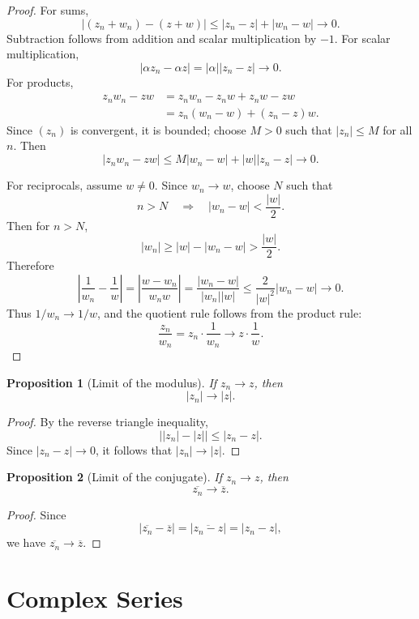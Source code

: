 \documentclass[11pt]{article}
\newtheorem{proposition}{Proposition}[section]
\newcommand{\abs}[1]{\left|#1\right|}
\newcommand{\conj}[1]{\overline{#1}}
\begin{document}
\begin{proof}
For sums,
\[
  \abs{(z_{n}+w_{n})-(z+w)}
  \le \abs{z_{n}-z}+\abs{w_{n}-w}\to0.
\]
Subtraction follows from addition and scalar multiplication by $-1$.
For scalar multiplication,
\[
  \abs{\alpha z_{n}-\alpha z}
  =\abs{\alpha}\abs{z_{n}-z}\to0.
\]
For products,
\[
\begin{aligned}
  z_{n}w_{n}-zw
    &=z_{n}w_{n}-z_{n}w+z_{n}w-zw \\
    &=z_{n}(w_{n}-w)+(z_{n}-z)w.
\end{aligned}
\]
Since $(z_{n})$ is convergent, it is bounded; choose $M>0$ such that $\abs{z_{n}}\le M$ for all $n$.
Then
\[
  \abs{z_{n}w_{n}-zw}
  \le M\abs{w_{n}-w}+\abs{w}\abs{z_{n}-z}\to0.
\]

For reciprocals, assume $w\ne0$.
Since $w_{n}\to w$, choose $N$ such that
\[
  n>N\quad\Longrightarrow\quad \abs{w_{n}-w}<\frac{\abs{w}}{2}.
\]
Then for $n>N$,
\[
  \abs{w_{n}}\ge \abs{w}-\abs{w_{n}-w}>\frac{\abs{w}}{2}.
\]
Therefore
\[
  \abs{\frac{1}{w_{n}}-\frac{1}{w}}
  =\abs{\frac{w-w_{n}}{w_{n}w}}
  =\frac{\abs{w_{n}-w}}{\abs{w_{n}}\abs{w}}
  \le \frac{2}{\abs{w}^{2}}\abs{w_{n}-w}\to0.
\]
Thus $1/w_{n}\to1/w$, and the quotient rule follows from the product rule:
\[
  \frac{z_{n}}{w_{n}}=z_{n}\cdot\frac{1}{w_{n}}\to z\cdot\frac{1}{w}.
\]
\end{proof}

\begin{proposition}[Limit of the modulus]
If $z_{n}\to z$, then
\[
  \abs{z_{n}}\to \abs{z}.
\]
\end{proposition}

\begin{proof}
By the reverse triangle inequality,
\[
  \bigl|\abs{z_{n}}-\abs{z}\bigr|\le \abs{z_{n}-z}.
\]
Since $\abs{z_{n}-z}\to0$, it follows that $\abs{z_{n}}\to\abs{z}$.
\end{proof}

\begin{proposition}[Limit of the conjugate]
If $z_{n}\to z$, then
\[
  \conj{z_{n}}\to \conj{z}.
\]
\end{proposition}

\begin{proof}
Since
\[
  \abs{\conj{z_{n}}-\conj{z}}
  =\abs{\conj{z_{n}-z}}
  =\abs{z_{n}-z},
\]
we have $\conj{z_{n}}\to\conj{z}$.
\end{proof}

\section{Complex Series}
\end{document}
